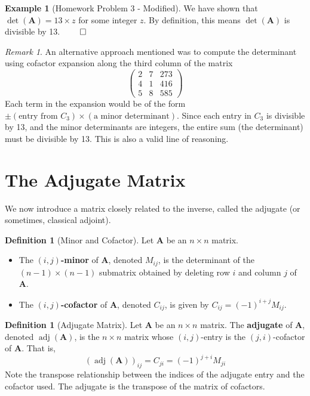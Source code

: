 \documentclass[11pt]{article}
\theoremstyle{definition}
\newtheorem{definition}[theorem]{Definition}
\newtheorem{example}[theorem]{Example}
\theoremstyle{remark}
\newtheorem{remark}[theorem]{Remark}
\DeclareMathOperator{\adj}{adj}
\newcommand{\mat}[1]{\mathbf{#1}} %
\begin{document}
\begin{example}[Homework Problem 3 - Modified]
We have shown that $\det(\mat{A}) = 13 \times z$ for some integer $z$. By definition, this means $\det(\mat{A})$ is divisible by 13. $\qed$

\begin{remark}
An alternative approach mentioned was to compute the determinant using cofactor expansion along the third column of the matrix
\[ \begin{pmatrix} 2 & 7 & 273 \\ 4 & 1 & 416 \\ 5 & 8 & 585 \end{pmatrix} \]
Each term in the expansion would be of the form $\pm (\text{entry from } C_3) \times (\text{a minor determinant})$. Since each entry in $C_3$ is divisible by 13, and the minor determinants are integers, the entire sum (the determinant) must be divisible by 13. This is also a valid line of reasoning.
\end{remark}
\end{example}

\section{The Adjugate Matrix}

We now introduce a matrix closely related to the inverse, called the adjugate (or sometimes, classical adjoint).

\begin{definition}[Minor and Cofactor]
Let $\mat{A}$ be an $n \times n$ matrix.
\begin{itemize}
    \item The \textbf{$(i,j)$-minor} of $\mat{A}$, denoted $M_{ij}$, is the determinant of the $(n-1) \times (n-1)$ submatrix obtained by deleting row $i$ and column $j$ of $\mat{A}$.
    \item The \textbf{$(i,j)$-cofactor} of $\mat{A}$, denoted $C_{ij}$, is given by $C_{ij} = (-1)^{i+j} M_{ij}$.
\end{itemize}
\end{definition}

\begin{definition}[Adjugate Matrix]
Let $\mat{A}$ be an $n \times n$ matrix. The \textbf{adjugate} of $\mat{A}$, denoted $\adj(\mat{A})$, is the $n \times n$ matrix whose $(i,j)$-entry is the $(j,i)$-cofactor of $\mat{A}$. That is,
\[ (\adj(\mat{A}))_{ij} = C_{ji} = (-1)^{j+i} M_{ji} \]
Note the transpose relationship between the indices of the adjugate entry and the cofactor used. The adjugate is the transpose of the matrix of cofactors.
\end{definition}
\end{document}
